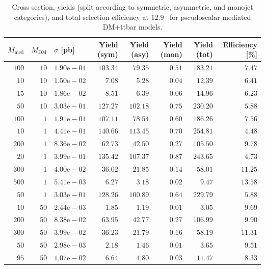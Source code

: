 \begin{table}
    \centering
    {\small
    \begin{tabular}{rrlrrrrr}
    \hline\hline
    $M_{\text{med}}$ & $M_{\text{DM}}$ & $\sigma$ [pb] & Yield (sym) & Yield (asy) & Yield (mon) & Yield (tot) & Efficiency [\%] \\
    \hline
    $100$ & $10$ & $1.90\text{e}-01$ & $103.34$ & $79.35$  & $0.51$ & $183.21$ & $7.47$  \\
    $10$  & $10$ & $1.50\text{e}-02$ & $7.08$   & $5.28$   & $0.04$ & $12.39$  & $6.41$  \\
    $15$  & $10$ & $1.86\text{e}-02$ & $8.51$   & $6.39$   & $0.06$ & $14.96$  & $6.23$  \\
    $50$  & $10$ & $3.03\text{e}-01$ & $127.27$ & $102.18$ & $0.75$ & $230.20$ & $5.88$  \\
    $100$ & $1$  & $1.91\text{e}-01$ & $107.11$ & $78.54$  & $0.60$ & $186.26$ & $7.56$  \\
    $10$  & $1$  & $4.41\text{e}-01$ & $140.66$ & $113.45$ & $0.70$ & $254.81$ & $4.48$  \\
    $200$ & $1$  & $8.36\text{e}-02$ & $62.73$  & $42.50$  & $0.27$ & $105.50$ & $9.78$  \\
    $20$  & $1$  & $3.99\text{e}-01$ & $135.42$ & $107.37$ & $0.87$ & $243.65$ & $4.73$  \\
    $300$ & $1$  & $4.00\text{e}-02$ & $36.02$  & $21.85$  & $0.14$ & $58.01$  & $11.25$ \\
    $500$ & $1$  & $5.41\text{e}-03$ & $6.27$   & $3.18$   & $0.02$ & $9.47$   & $13.58$ \\
    $50$  & $1$  & $3.03\text{e}-01$ & $128.26$ & $100.89$ & $0.64$ & $229.79$ & $5.88$  \\
    $10$  & $50$ & $2.44\text{e}-03$ & $1.85$   & $1.19$   & $0.01$ & $3.05$   & $9.69$  \\
    $200$ & $50$ & $8.38\text{e}-02$ & $63.95$  & $42.77$  & $0.27$ & $106.99$ & $9.90$  \\
    $300$ & $50$ & $3.99\text{e}-02$ & $36.23$  & $21.79$  & $0.16$ & $58.19$  & $11.31$ \\
    $50$  & $50$ & $2.98\text{e}-03$ & $2.18$   & $1.46$   & $0.01$ & $3.65$   & $9.51$  \\
    $95$  & $50$ & $1.07\text{e}-02$ & $6.64$   & $4.80$   & $0.03$ & $11.47$  & $8.33$  \\
    \hline\hline
    \end{tabular}
    }
    \caption{Cross section, yields (split according to symmetric, asymmetric, 
        and monojet categories), and total selection efficiency at $12.9$~\ifb 
        for pseudoscalar mediated DM+ttbar models.}
    \label{tab:DMttPS_yld}
\end{table}


